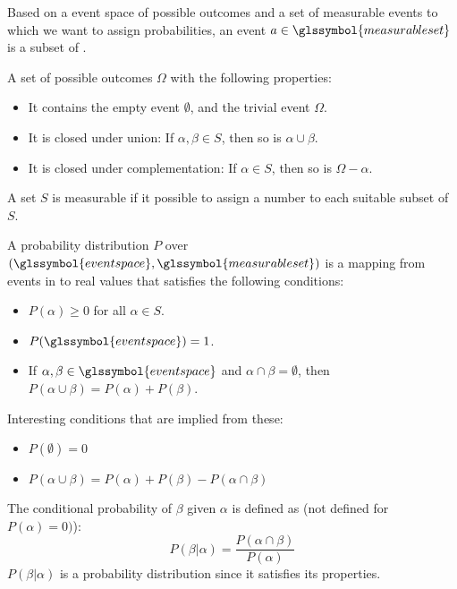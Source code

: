 {%
  Based on a \gls{event space} of possible outcomes  and a set of measurable events  to which we want to assign probabilities, an event $a \in \glssymbol{measurable set}$ is a subset of .\\
}

{%
  A set of possible outcomes $\Omega$ with the following properties:
  \begin{itemize}
    \item It contains the empty event $\emptyset$, and the trivial event $\Omega$.
    \item It is closed under union: If $\alpha, \beta \in S$, then so is $\alpha \cup \beta$.
    \item It is closed under complementation: If $\alpha \in S$, then so is $\Omega - \alpha$.
  \end{itemize}
}

{%
  A set $S$ is measurable if it possible to assign a number to each suitable subset of $S$.
}

{%
  A probability distribution $P$ over $(\glssymbol{event space},\glssymbol{measurable set})$ is a mapping from events in  to real values that satisfies the following conditions:
  \begin{itemize}
    \item $P(\alpha)\geq 0 $ for all $ \alpha \in S$.
    \item $P(\glssymbol{event space})=1$.
    \item If $\alpha,\beta\in \glssymbol{event space}$ and $\alpha\cap\beta = \emptyset$, then $P(\alpha\cup\beta)=P(\alpha)+P(\beta)$.
  \end{itemize}
  Interesting conditions that are implied from these:
  \begin{itemize}
    \item $P(\emptyset)=0$
    \item $P(\alpha\cup\beta)=P(\alpha)+P(\beta)-P(\alpha\cap\beta)$
  \end{itemize}
}

{%
  The conditional probability of $\beta$ given $\alpha$ is defined as (not defined for $P(\alpha)=0)$):
  \begin{equation*}
    P(\beta|\alpha)=\frac{P(\alpha\cap\beta)}{P(\alpha)}
  \end{equation*}
  $P(\beta|\alpha)$ is a \gls{probability distribution} since it satisfies its properties.
}

